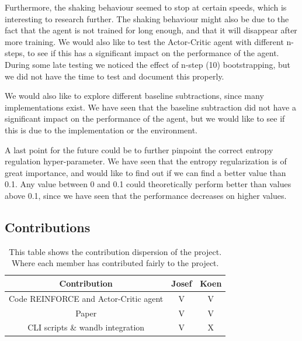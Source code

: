 \documentclass{article}
\begin{document}
Furthermore, the shaking behaviour seemed to stop at certain speeds, which is interesting to research further.
The shaking behaviour might also be due to the fact that the agent is not trained for long enough, and that it will disappear after more training.
We would also like to test the Actor-Critic agent with different n-steps, to see if this has a significant impact on the performance of the agent.
During some late testing we noticed the effect of n-step (10) bootstrapping, but we did not have the time to test and document this properly.

We would also like to explore different baseline subtractions, since many implementations exist.
We have seen that the baseline subtraction did not have a significant impact on the performance of the agent, but we would like to see if this is due to the implementation or the environment.


A last point for the future could be to further pinpoint the correct entropy regulation hyper-parameter.
We have seen that the entropy regularization is of great importance, and would like to find out  if we can find a better value than 0.1.
Any value between 0 and 0.1 could theoretically perform better than values above 0.1, since we have seen that the performance decreases on higher values.


\subsection{Contributions}
\label{C-Contributes}

\begin{table}[H]
    \centering
    \begin{tabular}{|c|c|c|}
        \hline
        \textbf{Contribution} & \textbf{Josef} & \textbf{Koen} \\
        \hline
    Code REINFORCE and Actor-Critic agent & V              & V             \\
    Paper                                 & V              & V             \\
    CLI scripts \& wandb integration      & V              & X       \\
    \hline     
    \end{tabular}
    \caption{This table shows the contribution dispersion of the project. Where each member has contributed fairly to the project.  }
    \label{tab:Contribution}
    \end{table}



\end{document}

